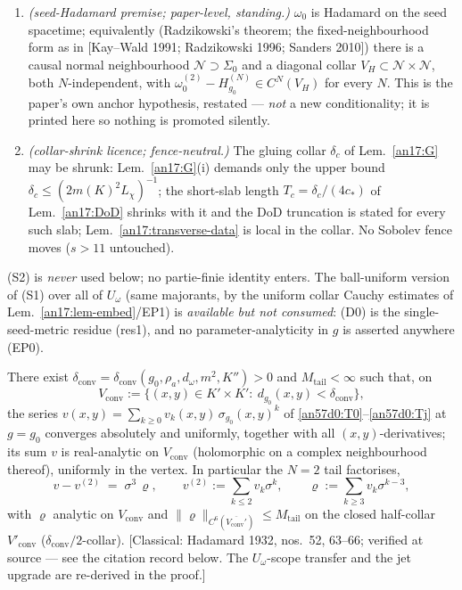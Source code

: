 \begin{enumerate}[label=\textup{(P-\alph*)},leftmargin=*,nosep]
\item \emph{(seed-Hadamard premise; paper-level, standing.)} $\omega_0$ is
  Hadamard on the seed spacetime; equivalently (Radzikowski's theorem; the
  fixed-neighbourhood form as in [Kay--Wald 1991; Radzikowski 1996; Sanders
  2010]) there is a causal normal neighbourhood $\mathcal N\supset\Sigma_0$
  and a diagonal collar $V_H\subset\mathcal N\times\mathcal N$, both
  $N$-independent, with $\omega^{(2)}_0-H^{(N)}_{g_0}\in C^N(V_H)$ for every
  $N$. This is the paper's own anchor hypothesis, restated --- \emph{not} a
  new conditionality; it is printed here so nothing is promoted silently.
\item \emph{(collar-shrink licence; fence-neutral.)} The gluing collar
  $\delta_c$ of Lem.\ \ref{an17:G} may be shrunk: Lem.~\ref{an17:G}(i) demands only the upper
  bound $\delta_c\le(2m(K)^2L_\chi)^{-1}$; the short-slab length
  $T_c=\delta_c/(4c_*)$ of Lem.\ \ref{an17:DoD} shrinks with it and the
  DoD truncation is stated for every such slab; Lem.\ \ref{an17:transverse-data}
  is local in the collar. No Sobolev fence moves ($s>11$ untouched).
\end{enumerate}
(S2) is \emph{never} used below; no partie-finie identity enters. The
ball-uniform version of (S1) over all of $U_\omega$ (same majorants, by the
uniform collar Cauchy estimates of Lem.~\ref{an17:lem-embed}/EP1) is \emph{available
but not consumed}: (D0) is the single-seed-metric residue (res1), and no parameter-analyticity in $g$ is asserted anywhere (EP0).

\begin{lemma}
\label{an57d0:lever}
There exist $\delta_{\mathrm{conv}}=\delta_{\mathrm{conv}}(g_0,\rho_a,
d_\omega,m^2,K'')>0$ and $M_{\mathrm{tail}}<\infty$ such that, on
\[
 V_{\mathrm{conv}}:=\{(x,y)\in K'\times K':\ d_{g_0}(x,y)<\delta_{\mathrm{conv}}\},
\]
the series $v(x,y)=\sum_{k\ge0}v_k(x,y)\,\sigma_{g_0}(x,y)^k$ of
\eqref{an57d0:T0}--\eqref{an57d0:Tj} at $g=g_0$ converges absolutely and
uniformly, together with all $(x,y)$-derivatives; its sum $v$ is
real-analytic on $V_{\mathrm{conv}}$ (holomorphic on a complex neighbourhood
thereof), uniformly in the vertex. In particular the $N{=}2$ tail factorises,
\[
 v-v^{(2)}\;=\;\sigma^3\,\varrho,\qquad v^{(2)}:={\textstyle\sum_{k\le2}}
 v_k\sigma^k,\qquad \varrho:={\textstyle\sum_{k\ge3}}v_k\sigma^{k-3},
\]
with $\varrho$ analytic on $V_{\mathrm{conv}}$ and
$\|\varrho\|_{C^6(\overline{V_{\mathrm{conv}}'})}\le M_{\mathrm{tail}}$ on
the closed half-collar $V'_{\mathrm{conv}}$
($\delta_{\mathrm{conv}}/2$-collar). \textup{[Classical: Hadamard 1932, nos.~52, 63--66;
verified at source --- see the citation record below. The
$U_\omega$-scope transfer and the jet upgrade are re-derived in the proof.]}
\end{lemma}

